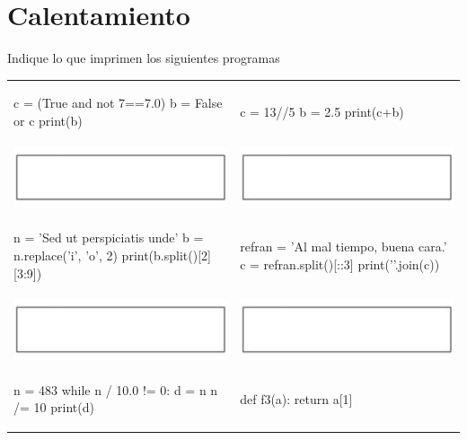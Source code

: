 \section{Calentamiento}

Indique lo que imprimen los siguientes programas

\begin{center}
\begin{tabular}{l l}
    \begin{tabularlstlisting}
c = (True and not 7==7.0)
b = False or c
print(b)
    \end{tabularlstlisting}
     & 
    \begin{tabularlstlisting}
c = 13//5
b = 2.5
print(c+b)
    \end{tabularlstlisting}
    \\
    \includegraphics[scale=0.75]{Imagenes/cuadrado} & \includegraphics[scale=0.75]{Imagenes/cuadrado} \\
    \begin{tabularlstlisting}
n = 'Sed ut perspiciatis unde'
b = n.replace('i', 'o', 2)
print(b.split()[2][3:9])
    \end{tabularlstlisting}
     & 
    \begin{tabularlstlisting}
refran = 'Al mal tiempo, buena cara.'
c = refran.split()[::3]
print('\n'.join(c))
    \end{tabularlstlisting}
    \\
    \includegraphics[scale=0.75]{Imagenes/cuadrado} & \includegraphics[scale=0.75]{Imagenes/cuadrado} \\
    \begin{tabularlstlisting}
n = 483
while n / 10.0 != 0:
    d = n %
    n /= 10
print(d)
    \end{tabularlstlisting}
     & 
    \begin{tabularlstlisting}
def f3(a):
    return a[1]


\end{tabularlstlisting}
\end{tabular}
\end{center}
